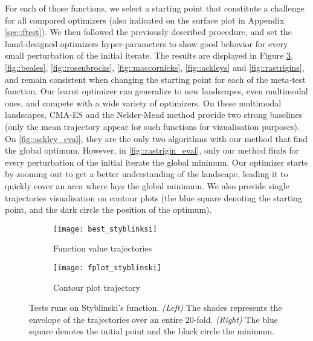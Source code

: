 {		For each of those functions, we select a starting point that constitute a challenge for all compared optimizers (also indicated on the surface plot in Appendix \ref{sec::ftest}). We then followed the previously described procedure, and set the hand-designed optimizers hyper-parameters to show good behavior for every small perturbation of the initial iterate. The results are displayed in Figure \ref{fig::styblinskis}, \ref{fig::beales}, \ref{fig::rosenbrocks}, \ref{fig::maccornicks}, \ref{fig::ackleys} and \ref{fig::rastrigins}, and remain consistent when changing the starting point for each of the meta-test function. Our learnt optimizer can generalize to new landscapes, even multimodal ones, and compete with a wide variety of optimizers. On these multimodal landscapes, CMA-ES and the Nelder-Mead method provide two strong baselines (only the mean trajectory appear for such functions for vizualisation purposes). On \ref{fig::ackley_eval}, they are the only two algorithms with our method that find the global optimum. However, in \ref{fig::rastrigin_eval}, only our method finds for every perturbation of the initial iterate the global minimum. Our optimizer starts by zooming out to get a better understanding of the landscape, leading it to quickly cover an area where lays the global minimum. We also provide single trajectories visualisation on contour plots (the blue square denoting the starting point, and the dark circle the position of the optimum).


		\begin{figure}[h!]
			\centering
			\begin{subfigure}[b]{0.45\linewidth}
			{
				\centering
				\texttt{[image: best\_styblinksi]}
				\caption{Function value trajectories}
				\label{fig::styblinksi_eval}
			}
			\end{subfigure}
			\hfill
			\begin{subfigure}[b]{0.45\linewidth}
			{
				\centering
				\texttt{[image: fplot\_styblinski]}
				\caption{Contour plot trajectory}
				\label{fig::styblinksi_eval_traj}
			}
			\end{subfigure}
		\caption[Tests runs on Styblinski's function]{Tests runs on Styblinski's function. \emph{(Left)} The shades represents the envelope of the trajectories over an entire 20-fold. \emph{(Right)} The blue square denotes the initial point and the black circle the minimum.}
		\label{fig::styblinskis}
		\end{figure}
		
}
